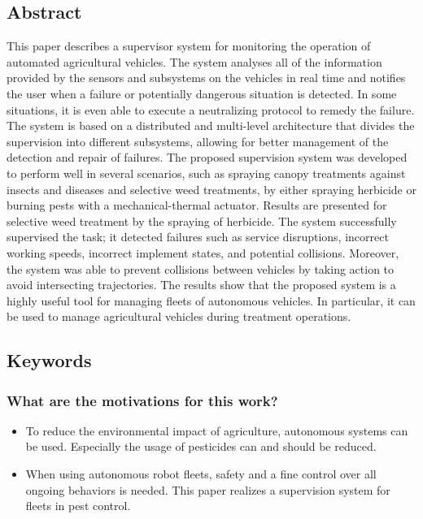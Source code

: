     \subsection*{Abstract}
    This paper describes a supervisor system for monitoring the operation of automated
    agricultural vehicles. The system analyses all of the information provided by the sensors and
    subsystems on the vehicles in real time and notifies the user when a failure or potentially
    dangerous situation is detected. In some situations, it is even able to execute a neutralizing
    protocol to remedy the failure. The system is based on a distributed and multi-level architecture
    that divides the supervision into different subsystems, allowing for better management of the
    detection and repair of failures. The proposed supervision system was developed to perform
    well in several scenarios, such as spraying canopy treatments against insects and diseases
    and selective weed treatments, by either spraying herbicide or burning pests with a
    mechanical-thermal actuator. Results are presented for selective weed treatment by the
    spraying of herbicide. The system successfully supervised the task; it detected failures such
    as service disruptions, incorrect working speeds, incorrect implement states, and potential
    collisions. Moreover, the system was able to prevent collisions between vehicles by taking
    action to avoid intersecting trajectories. The results show that the proposed system is a highly
    useful tool for managing fleets of autonomous vehicles. In particular, it can be used to
    manage agricultural vehicles during treatment operations.
    
    \subsection*{Keywords}
    
     
    \subsubsection*{What are the motivations for this work?}
    \begin{itemize}
        \item To reduce the environmental impact of agriculture, autonomous systems can be used. Especially the usage of pesticides can and should be reduced. 
        \item When using autonomous robot fleets, safety and a fine control over all ongoing behaviors is needed. This paper realizes a supervision system for fleets in pest control.
    \end{itemize}
